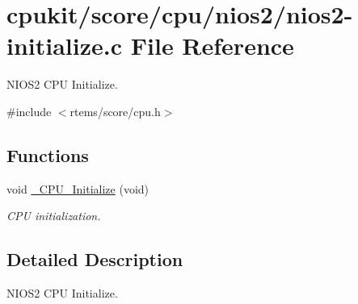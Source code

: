 \hypertarget{nios2-initialize_8c}{}\section{cpukit/score/cpu/nios2/nios2-\/initialize.c File Reference}
\label{nios2-initialize_8c}


N\+I\+O\+S2 C\+PU Initialize.  


{\ttfamily \#include $<$rtems/score/cpu.\+h$>$}\newline
\subsection*{Functions}
\begin{DoxyCompactItemize}
\item 
void \mbox{\hyperlink{group__RTEMSScoreCPUARM_ga869484e3d851b032fd826c69ff21fc72}{\+\_\+\+C\+P\+U\+\_\+\+Initialize}} (void)
\begin{DoxyCompactList}\small\item\em C\+PU initialization. \end{DoxyCompactList}\end{DoxyCompactItemize}


\subsection{Detailed Description}
N\+I\+O\+S2 C\+PU Initialize. 

